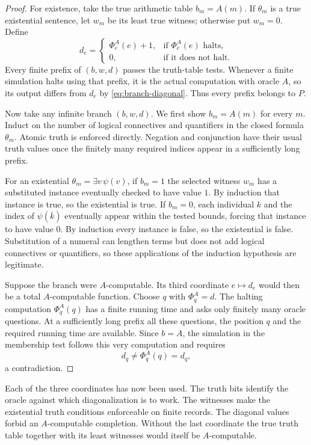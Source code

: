 \documentclass[11pt]{article}
\theoremstyle{definition}
\newcommand{\num}[1]{\overline{#1}}
\begin{document}
\begin{proof}
For existence, take the true arithmetic table $b_m=A(m)$. If $\theta_m$ is
a true existential sentence, let $w_m$ be its least true witness; otherwise
put $w_m=0$. Define
\begin{equation}\label{eq:branch-diagonal}
 d_e=\begin{cases}
 \Phi_e^A(e)+1,&\text{if }\Phi_e^A(e)\text{ halts},\\
 0,&\text{if it does not halt}.
 \end{cases}
\end{equation}
Every finite prefix of $(b,w,d)$ passes the truth-table tests. Whenever a
finite simulation halts using that prefix, it is the actual computation
with oracle $A$, so its output differs from $d_e$ by
\eqref{eq:branch-diagonal}. Thus every prefix belongs to $P$.

Now take any infinite branch $(b,w,d)$. We first show $b_m=A(m)$ for every
$m$. Induct on the number of logical connectives and quantifiers in the
closed formula $\theta_m$. Atomic truth is enforced directly. Negation
and conjunction have their usual truth values once the finitely many
required indices appear in a sufficiently long prefix.

For an existential $\theta_m=\exists v\,\psi(v)$, if $b_m=1$ the
selected witness $w_m$ has a substituted instance eventually checked to
have value $1$. By induction that instance is true, so the existential is
true. If $b_m=0$, each individual $k$ and the index of
$\psi(\num k)$ eventually appear within the tested bounds, forcing that
instance to have value $0$. By induction every instance is false, so the
existential is false. Substitution of a numeral can lengthen terms but
does not add logical connectives or quantifiers, so these applications of
the induction hypothesis are legitimate.

Suppose the branch were $A$-computable. Its third coordinate $e\mapsto d_e$
would then be a total $A$-computable function. Choose $q$ with
$\Phi_q^A=d$. The halting computation $\Phi_q^A(q)$ has a finite running
time and asks only finitely many oracle questions. At a sufficiently long
prefix all these questions, the position $q$ and the required running time
are available. Since $b=A$, the simulation in the membership test follows
this very computation and requires
\[
 d_q\ne\Phi_q^A(q)=d_q,
\]
a contradiction.
\end{proof}

Each of the three coordinates has now been used. The truth bits identify
the oracle against which diagonalization is to work. The witnesses make
the existential truth conditions enforceable on finite records. The
diagonal values forbid an $A$-computable completion. Without the last
coordinate the true truth table together with its least witnesses would
itself be $A$-computable.
\end{document}

